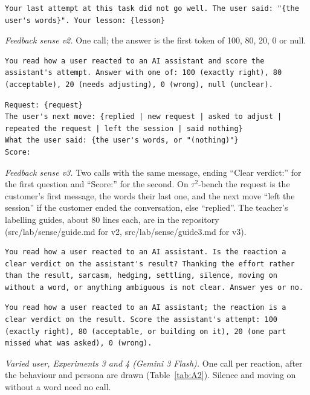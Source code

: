 \begin{verbatim}
Your last attempt at this task did not go well. The user said: "{the user's words}". Your lesson: {lesson}
\end{verbatim}

\emph{Feedback sense v2.} One call; the answer is the first token of 100, 80, 20, 0 or null.

\begin{verbatim}
You read how a user reacted to an AI assistant and score the assistant's attempt. Answer with one of: 100 (exactly right), 80 (acceptable), 20 (needs adjusting), 0 (wrong), null (unclear).
\end{verbatim}

\begin{verbatim}
Request: {request}
The user's next move: {replied | new request | asked to adjust | repeated the request | left the session | said nothing}
What the user said: {the user's words, or "(nothing)"}
Score:
\end{verbatim}

\emph{Feedback sense v3.} Two calls with the same message, ending ``Clear verdict:'' for the first question and ``Score:'' for the second. On $\tau^2$-bench the request is the customer's first message, the words their last one, and the next move ``left the session'' if the customer ended the conversation, else ``replied''. The teacher's labelling guides, about 80 lines each, are in the repository (src/lab/sense/guide.md for v2, src/lab/sense/guide3.md for v3).

\begin{verbatim}
You read how a user reacted to an AI assistant. Is the reaction a clear verdict on the assistant's result? Thanking the effort rather than the result, sarcasm, hedging, settling, silence, moving on without a word, or anything ambiguous is not clear. Answer yes or no.
\end{verbatim}

\begin{verbatim}
You read how a user reacted to an AI assistant; the reaction is a clear verdict on the result. Score the assistant's attempt: 100 (exactly right), 80 (acceptable, or building on it), 20 (one part missed what was asked), 0 (wrong).
\end{verbatim}

\emph{Varied user, Experiments 3 and 4 (Gemini 3 Flash).} One call per reaction, after the behaviour and persona are drawn (Table~\ref{tab:A2}). Silence and moving on without a word need no call.

